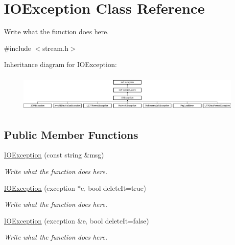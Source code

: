 \hypertarget{classIOException}{\section{I\+O\+Exception Class Reference}
\label{classIOException}
}


Write what the function does here.  




{\ttfamily \#include $<$stream.\+h$>$}

Inheritance diagram for I\+O\+Exception\+:\begin{figure}[H]
\begin{center}
\leavevmode
\includegraphics[height=1.871345cm]{classIOException}
\end{center}
\end{figure}
\subsection*{Public Member Functions}
\begin{DoxyCompactItemize}
\item 
\hyperlink{classIOException_a73fcf78b1b5820aa158680e896f0b983}{I\+O\+Exception} (const string \&msg)
\begin{DoxyCompactList}\small\item\em Write what the function does here. \end{DoxyCompactList}\item 
\hyperlink{classIOException_a286c271ca82812d1e7c12925acf33d14}{I\+O\+Exception} (exception $\ast$e, bool delete\+It=true)
\begin{DoxyCompactList}\small\item\em Write what the function does here. \end{DoxyCompactList}\item 
\hyperlink{classIOException_abf6ec1a6297e0558758ef144e9e36471}{I\+O\+Exception} (exception \&e, bool delete\+It=false)
\begin{DoxyCompactList}\small\item\em Write what the function does here. \end{DoxyCompactList}\end{DoxyCompactItemize}


